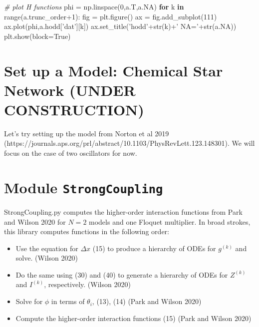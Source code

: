 \documentclass[english,a4paper,oneside]{article}
\newenvironment{Shaded}{}{}
\newcommand{\KeywordTok}[1]{\textcolor[rgb]{0.00,0.44,0.13}{\textbf{#1}}}
\newcommand{\DecValTok}[1]{\textcolor[rgb]{0.25,0.63,0.44}{#1}}
\newcommand{\StringTok}[1]{\textcolor[rgb]{0.25,0.44,0.63}{#1}}
\newcommand{\CommentTok}[1]{\textcolor[rgb]{0.38,0.63,0.69}{\textit{#1}}}
\newcommand{\VariableTok}[1]{\textcolor[rgb]{0.10,0.09,0.49}{#1}}
\newcommand{\ControlFlowTok}[1]{\textcolor[rgb]{0.00,0.44,0.13}{\textbf{#1}}}
\newcommand{\OperatorTok}[1]{\textcolor[rgb]{0.40,0.40,0.40}{#1}}
\newcommand{\BuiltInTok}[1]{#1}
\newcommand{\NormalTok}[1]{#1}
\providecommand{\tightlist}{%
  \setlength{\itemsep}{0pt}\setlength{\parskip}{0pt}}
\begin{document}
\begin{Shaded}
\begin{Highlighting}[]
    \CommentTok{# plot H functions}
\NormalTok{    phi }\OperatorTok{=}\NormalTok{ np.linspace(}\DecValTok{0}\NormalTok{,a.T,a.NA)}
    \ControlFlowTok{for}\NormalTok{ k }\KeywordTok{in} \BuiltInTok{range}\NormalTok{(a.trunc_order}\OperatorTok{+}\DecValTok{1}\NormalTok{):}
\NormalTok{        fig }\OperatorTok{=}\NormalTok{ plt.figure()}
\NormalTok{        ax }\OperatorTok{=}\NormalTok{ fig.add_subplot(}\DecValTok{111}\NormalTok{)}
\NormalTok{        ax.plot(phi,a.hodd[}\StringTok{'dat'}\NormalTok{][k])}
\NormalTok{        ax.set_title(}\StringTok{'hodd'}\OperatorTok{+}\BuiltInTok{str}\NormalTok{(k)}\OperatorTok{+}\StringTok{' NA='}\OperatorTok{+}\BuiltInTok{str}\NormalTok{(a.NA))}
\NormalTok{        plt.show(block}\OperatorTok{=}\VariableTok{True}\NormalTok{)}
\end{Highlighting}
\end{Shaded}

\section{Set up a Model: Chemical Star Network (UNDER
CONSTRUCTION)}\label{set-up-a-model-chemical-star-network-under-construction}

Let's try setting up the model from Norton et al 2019
(https://journals.aps.org/prl/abstract/10.1103/PhysRevLett.123.148301).
We will focus on the case of two oscillators for now.

\section{\texorpdfstring{Module
\texttt{StrongCoupling}}{Module StrongCoupling}}\label{StrongCoupling}

StrongCoupling.py computes the higher-order interaction functions from
Park and Wilson 2020 for \(N=2\) models and one Floquet multiplier. In
broad strokes, this library computes functions in the following order:

\begin{itemize}
\tightlist
\item
  Use the equation for \(\Delta x\) (15) to produce a hierarchy of ODEs
  for \(g^{(k)}\) and solve. (Wilson 2020)
\item
  Do the same using (30) and (40) to generate a hierarchy of ODEs for
  \(Z^{(k)}\) and \(I^{(k)}\), respectively. (Wilson 2020)
\item
  Solve for \(\phi\) in terms of \(\theta_i\), (13), (14) (Park and
  Wilson 2020)
\item
  Compute the higher-order interaction functions (15) (Park and Wilson
  2020)
\end{itemize}
\end{document}

